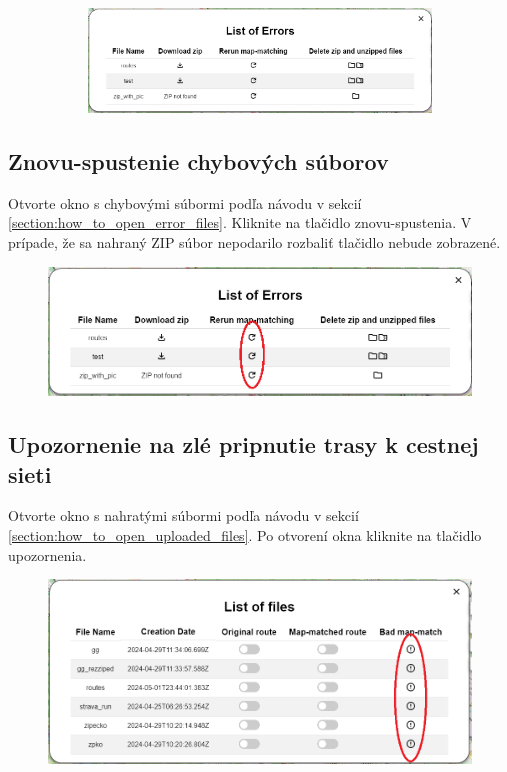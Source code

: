\begin{figure}[H]
\begin{subfigure}{0.2\textwidth}
    \end{subfigure}
    \begin{subfigure}{.78\textwidth}
        \centering
        \includegraphics[width=1\textwidth]{guide_includes/img/errors.png}
    \end{subfigure}
\end{figure}

\subsection{Znovu-spustenie chybových súborov}
Otvorte okno s chybovými súbormi podľa návodu v sekcií \ref{section:how_to_open_error_files}. Kliknite na tlačidlo znovu-spustenia. V prípade, že sa nahraný ZIP súbor nepodarilo rozbaliť tlačidlo nebude zobrazené.
\begin{figure}[H]
    \centering
    \includegraphics[width=1\textwidth]{guide_includes/img/rerun_map_match.png}
\end{figure}

\pagebreak
\subsection{Upozornenie na zlé pripnutie trasy k cestnej sieti}
Otvorte okno s nahratými súbormi podľa návodu v sekcií \ref{section:how_to_open_uploaded_files}. Po otvorení okna kliknite na tlačidlo upozornenia.
\begin{figure}[H]
    \centering
    \includegraphics[width=1\textwidth]{guide_includes/img/bad_map_match_notify.png}
\end{figure}